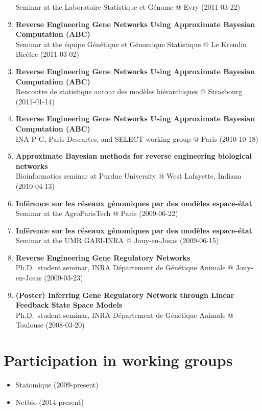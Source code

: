\documentclass[11pt, a4paper]{awesome-cv}
\providecommand{\tightlist}{%
	\setlength{\itemsep}{0pt}\setlength{\parskip}{0pt}}
\begin{document}
\begin{enumerate}
  Seminar at the Laboratoire Statistique et Génome @ Evry (2011-03-22)
\item
  \textbf{Reverse Engineering Gene Networks Using Approximate Bayesian
  Computation (ABC)}\\
  Seminar at the équipe Génétique et Génomique Statistique @ Le Kremlin
  Bicêtre (2011-03-02)
\item
  \textbf{Reverse Engineering Gene Networks Using Approximate Bayesian
  Computation (ABC)}\\
  Rencontre de statistique autour des modèles hiérarchiques @ Strasbourg
  (2011-01-14)
\item
  \textbf{Reverse Engineering Gene Networks Using Approximate Bayesian
  Computation (ABC)}\\
  INA P-G, Paris Descartes, and SELECT working group @ Paris
  (2010-10-18)
\item
  \textbf{Approximate Bayesian methods for reverse engineering
  biological networks}\\
  Bioinformatics seminar at Purdue University @ West Lafayette, Indiana
  (2010-04-13)
\item
  \textbf{Inférence sur les réseaux génomiques par des modèles
  espace-état}\\
  Seminar at the AgroParisTech @ Paris (2009-06-22)
\item
  \textbf{Inférence sur les réseaux génomiques par des modèles
  espace-état}\\
  Seminar at the UMR GABI-INRA @ Jouy-en-Josas (2009-06-15)
\item
  \textbf{Reverse Engineering Gene Regulatory Networks}\\
  Ph.D.~student seminar, INRA Département de Génétique Animale @
  Jouy-en-Josas (2009-03-23)
\item
  \textbf{(Poster) Inferring Gene Regulatory Network through Linear
  Feedback State Space Models}\\
  Ph.D.~student seminar, INRA Département de Génétique Animale @
  Toulouse (2008-03-20)
\end{enumerate}

\hypertarget{participation-in-working-groups}{%
\section{Participation in working
groups}\label{participation-in-working-groups}}

\begin{itemize}
\tightlist
\item
  Statomique (2009-present)
\item
  Netbio (2014-present)
\end{itemize}
\end{document}
